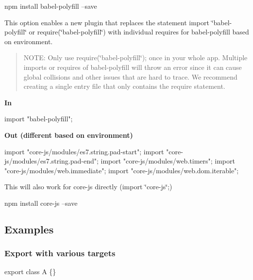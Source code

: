 \begin{DoxyCode}
npm install babel-polyfill --save
\end{DoxyCode}


This option enables a new plugin that replaces the statement {\ttfamily import \char`\"{}babel-\/polyfill\char`\"{}} or {\ttfamily require(\char`\"{}babel-\/polyfill\char`\"{})} with individual requires for {\ttfamily babel-\/polyfill} based on environment.

\begin{quote}
N\+O\+TE\+: Only use {\ttfamily require(\char`\"{}babel-\/polyfill\char`\"{});} once in your whole app. Multiple imports or requires of {\ttfamily babel-\/polyfill} will throw an error since it can cause global collisions and other issues that are hard to trace. We recommend creating a single entry file that only contains the {\ttfamily require} statement. \end{quote}


{\bfseries In}


\begin{DoxyCode}
import "babel-polyfill";
\end{DoxyCode}


{\bfseries Out (different based on environment)}


\begin{DoxyCode}
import "core-js/modules/es7.string.pad-start";
import "core-js/modules/es7.string.pad-end";
import "core-js/modules/web.timers";
import "core-js/modules/web.immediate";
import "core-js/modules/web.dom.iterable";
\end{DoxyCode}


This will also work for {\ttfamily core-\/js} directly ({\ttfamily import \char`\"{}core-\/js\char`\"{};})


\begin{DoxyCode}
npm install core-js --save
\end{DoxyCode}
 



\subsection*{Examples}

\subsubsection*{Export with various targets}


\begin{DoxyCode}
export class A \{\}
\end{DoxyCode}


